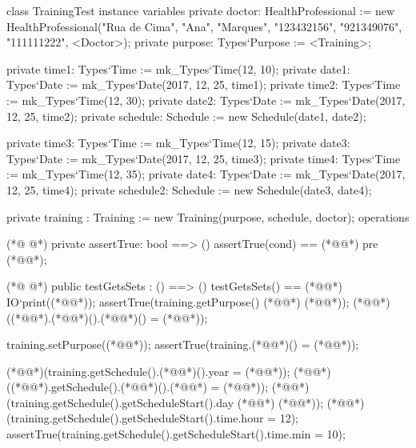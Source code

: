 \begin{vdmpp}[breaklines=true]
class TrainingTest
instance variables
 private doctor: HealthProfessional := new HealthProfessional("Rua de Cima", "Ana", "Marques", "123432156", "921349076", "111111222", <Doctor>);
  private purpose: Types`Purpose := <Training>;
  
 private time1: Types`Time := mk_Types`Time(12, 10);
 private date1: Types`Date := mk_Types`Date(2017, 12, 25, time1);
 private time2: Types`Time := mk_Types`Time(12, 30);
 private date2: Types`Date := mk_Types`Date(2017, 12, 25, time2);
 private schedule: Schedule := new Schedule(date1, date2);
 
 private time3: Types`Time := mk_Types`Time(12, 15);
 private date3: Types`Date := mk_Types`Date(2017, 12, 25, time3);
 private time4: Types`Time := mk_Types`Time(12, 35);
 private date4: Types`Date := mk_Types`Date(2017, 12, 25, time4);
 private schedule2: Schedule := new Schedule(date3, date4);
 
 private training : Training := new Training(purpose, schedule, doctor);
operations
 
(*@
\label{assertTrue:21}
@*)
 private assertTrue: bool ==> ()
  assertTrue(cond) == (*@@*)
 pre (*@@*);
 
(*@
\label{testGetsSets:25}
@*)
 public testGetsSets : () ==> ()
  testGetsSets() == (*@\vdmnotcovered{(}@*)
   IO`print((*@@*));
   assertTrue(training.getPurpose() (*@\vdmnotcovered{=}@*) (*@@*));
   (*@@*)((*@@*).(*@@*)().(*@@*)() = (*@@*));
   
   training.setPurpose((*@@*));
   assertTrue(training.(*@@*)() = (*@@*));
   
   (*@@*)(training.getSchedule().(*@@*)().year = (*@@*));
   (*@@*)((*@@*).getSchedule().(*@@*)().(*@@*) = (*@@*));
   (*@@*)(training.getSchedule().getScheduleStart().day (*@\vdmnotcovered{=}@*) (*@@*));
   (*@@*)(training.getSchedule().getScheduleStart().time.hour = 12);
   assertTrue(training.getSchedule().getScheduleStart().time.min = 10);
   

\end{vdmpp}
